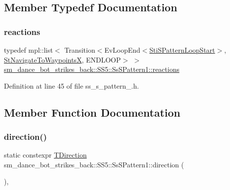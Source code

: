 \subsection{Member Typedef Documentation}
\mbox{\label{structsm__dance__bot__strikes__back_1_1SS5_1_1SsSPattern1_a077ab9e3328529d25438003716310822}} 
\subsubsection{\texorpdfstring{reactions}{reactions}}
{\footnotesize\ttfamily typedef mpl\+::list$<$ Transition$<$Ev\+Loop\+End$<$\hyperlink{structsm__dance__bot__strikes__back_1_1s__pattern__states_1_1StiSPatternLoopStart}{Sti\+S\+Pattern\+Loop\+Start}$>$, \hyperlink{structsm__dance__bot__strikes__back_1_1StNavigateToWaypointsX}{St\+Navigate\+To\+WaypointsX}, E\+N\+D\+L\+O\+OP$>$ $>$ \hyperlink{structsm__dance__bot__strikes__back_1_1SS5_1_1SsSPattern1_a077ab9e3328529d25438003716310822}{sm\+\_\+dance\+\_\+bot\+\_\+strikes\+\_\+back\+::\+S\+S5\+::\+Ss\+S\+Pattern1\+::reactions}}



Definition at line 45 of file ss\+\_\+s\+\_\+pattern\+\_.\+h.



\subsection{Member Function Documentation}
\mbox{\label{structsm__dance__bot__strikes__back_1_1SS5_1_1SsSPattern1_ab6ad418e38e92a3f8595f266fdb0e621}} 
\subsubsection{\texorpdfstring{direction()}{direction()}}
{\footnotesize\ttfamily static constexpr \hyperlink{namespacesm__dance__bot__strikes__back_1_1SS5_a9bfe9437a81f94ff39bae6daa0cec2e6}{T\+Direction} sm\+\_\+dance\+\_\+bot\+\_\+strikes\+\_\+back\+::\+S\+S5\+::\+Ss\+S\+Pattern1\+::direction (\begin{DoxyParamCaption}{ }\end{DoxyParamCaption})\hspace{0.3cm}{\ttfamily [inline]}, {\ttfamily [static]}}



